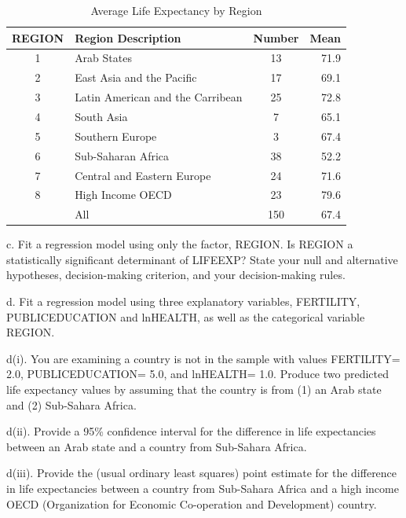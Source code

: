 \begin{exercises}
\begin{table}[h]
 \caption{\label{Ex:UNLIFERegionStats} \small Average
Life Expectancy by Region}
\begin{center}
\begin{tabular}{c|lcr}
\hline
    REGION & Region Description &     Number &       Mean \\ \hline
         1 & Arab States &         13 &       71.9 \\
         2 & East Asia and the Pacific &         17 &       69.1 \\
         3 & Latin American and the Carribean &         25 &       72.8 \\
         4 & South Asia &          7 &       65.1 \\
         5 & Southern Europe &          3 &       67.4 \\
         6 & Sub-Saharan Africa &         38 &       52.2 \\
         7 & Central and Eastern Europe &         24 &       71.6 \\
         8 & High Income OECD &         23 &       79.6 \\\hline
           & All          &        150 &     67.4       \\\hline
\end{tabular}
\end{center}
\end{table}

c. Fit a regression model using only the factor, REGION. Is REGION a
statistically significant determinant of LIFEEXP? State your null
and alternative hypotheses, decision-making criterion, and your
decision-making rules.

d. Fit a regression model using three explanatory variables,
FERTILITY, PUBLICEDUCATION and lnHEALTH, as well as the categorical
variable REGION.

d(i). You are examining a country is not in the sample with values
FERTILITY= 2.0, PUBLICEDUCATION= 5.0,  and lnHEALTH= 1.0. Produce
two predicted life expectancy values by assuming that the country is
from (1) an Arab state and (2) Sub-Sahara Africa.

d(ii). Provide a 95\% confidence interval for the difference in life
expectancies between an Arab state and a country from Sub-Sahara
Africa.

d(iii). Provide the (usual ordinary least squares) point estimate
for the difference in life expectancies between a country from
Sub-Sahara Africa and a high income OECD (Organization for Economic
Co-operation and Development) country.

\end{exercises}

